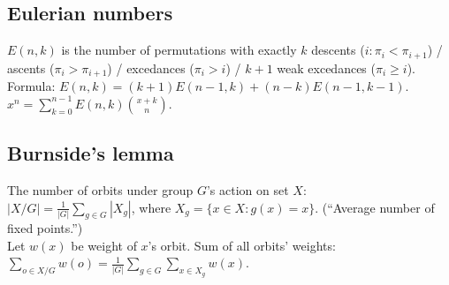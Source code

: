 \documentclass[12pt]{extarticle}
\begin{document}
\begin{multicols*}{2}


\subsection{Eulerian numbers}
$E(n,k)$ is the number of permutations with exactly
$k$ descents ($i: \pi_i < \pi_{i+1}$) /
ascents ($\pi_i > \pi_{i+1}$) /
excedances ($\pi_i > i$) /
$k+1$ weak excedances ($\pi_i \ge i$). \\
Formula: $E(n,k)=(k+1)E(n-1,k)+(n-k)E(n-1,k-1)$. \quad
$x^n = \sum_{k=0}^{n-1} E(n,k) {x+k \choose n}$.

\subsection{Burnside's lemma}
The number of orbits under group $G$'s action on set $X$:\\
$|X/G| = \frac{1}{|G|} \sum_{g \in G} |X_g|$,
where $X_g=\{ x \in X: g(x)=x \}$. (``Average number of fixed points.'') \\
Let $w(x)$ be weight of $x$'s orbit. Sum of all orbits' weights:
$\sum_{o \in X/G} w(o) = \frac{1}{|G|} \sum_{g \in G} \sum_{x \in X_g} w(x)$.



\end{multicols*}
\end{document}
